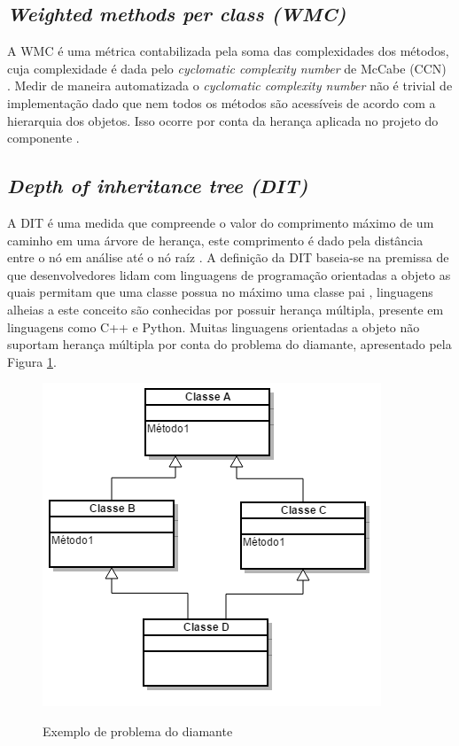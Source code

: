 \documentclass[
	12pt,				%
	oneside,			%
	a4paper,			%
	english,			%
	brazil				%
	]{abntex2ppgsi}
\begin{document}
\subsection{\textit{Weighted methods per class (WMC)}}
A WMC é uma métrica contabilizada pela soma das complexidades dos métodos, cuja complexidade é dada pelo \textit{cyclomatic complexity number}  de McCabe (CCN)\cite{kan95} \cite{watson96}. Medir de maneira automatizada o \textit{cyclomatic complexity number} não é trivial de implementação dado que nem todos os métodos são acessíveis de acordo com a hierarquia dos objetos. Isso ocorre por conta da herança aplicada no projeto do componente \cite{kan95}.

\subsection{\textit{Depth of inheritance tree (DIT)}}
A DIT é uma medida que compreende o valor do comprimento máximo de um caminho em uma árvore de herança, este comprimento é dado pela distância entre o nó em análise até o nó raíz \cite{kan95}. A definição da DIT baseia-se na premissa de que desenvolvedores lidam com linguagens de programação orientadas a objeto as quais permitam que uma classe possua no máximo uma classe pai \cite{bruntink04}, linguagens alheias a este conceito são conhecidas por possuir herança múltipla, presente em linguagens como C++ e Python. Muitas linguagens orientadas a objeto não suportam herança múltipla por conta do problema do diamante, apresentado pela Figura \ref{fig:diagra-diamante}.

\begin{figure}[H]%
	\centering
 	  \caption{Exemplo de problema do diamante}
		\includegraphics{diagrama_diamante.png}
	\label{fig:diagra-diamante}
\end{figure}
\end{document}
